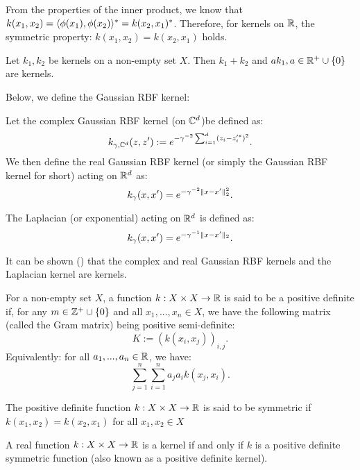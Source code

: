 \documentclass[twoside]{memoir}
\begin{document}
	From the properties of the inner product, we know that $k(x_1, x_2) = \langle\phi(x_1), \phi(x_2)\rangle^* = k(x_2, x_1)^*$. Therefore, for kernels on $\mathbb{R}$, the symmetric property: $k(x_1, x_2) = k(x_2, x_1)$ holds.
	\begin{lem}
		Let $k_1, k_2$ be kernels on a non-empty set $X$. Then $k_1 + k_2$ and $ak_1, a \in \mathbb{R}^+ \cup \{0\}$ are kernels. 
	\end{lem}
	Below, we define the Gaussian RBF kernel:
	\begin{defn}\label{defn:Gaussian_Kernel}
		Let the complex Gaussian RBF kernel (on $\mathbb{C}^d$)be defined as:
		\[ k_{\gamma, \mathbb{C}^d}(z, z') := e^{-\gamma^{-2} \sum_{i=1}^{d} (z_i - z_i'^*)^2 } .\]
		We then define the real Gaussian RBF kernel (or simply the Gaussian RBF kernel for short) acting on $\mathbb{R}^d$ as:
		\[ k_\gamma(x, x') = e^{- \gamma^{-2} \lVert x - x'\rVert_2^2}. \]
	\end{defn}
	\begin{defn}
	The Laplacian (or exponential) acting on $\mathbb{R}^d$ is defined as:
	\[ k_\gamma(x, x') = e^{- \gamma^{-1} \lVert x - x'\rVert_2}. \]	
	\end{defn}
	It can be shown (\cite{steinwartSVM}) that the complex and real Gaussian RBF kernels and the Laplacian kernel are kernels.
	\begin{defn}
		For a non-empty set $X$, a function $k: X \times X \rightarrow \mathbb{R}$ is said to be a positive definite if, for any $m \in \mathbb{Z}^+ \cup \{0\}$ and all $x_1, ..., x_n \in X$, we have the following matrix (called the Gram matrix) being positive semi-definite:
		\[ K := (k(x_i, x_j))_{i,j}. \]
		Equivalently: for all $a_1, ..., a_n \in \mathbb{R}$, we have:
		\[ \sum_{j=1}^{n} \sum_{i=1}^{n} a_j a_i k(x_j, x_i). \]
	\end{defn}
	\begin{defn}
		The positive definite function $k: X \times X \rightarrow \mathbb{R}$ is said to be symmetric if  $k(x_1, x_2) = k(x_2, x_1)$ for all $x_1, x_2 \in X$
	\end{defn}
	\begin{thm}
		A real function $k:X \times X \rightarrow \mathbb{R}$ is a kernel if and only if $k$ is a positive definite symmetric function (also known as a positive definite kernel).
	\end{thm}
\end{document}
